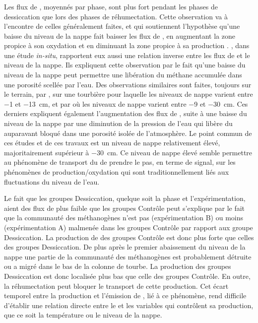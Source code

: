\subsubsection{\chh}
Les flux de \chh, moyennés par phase, sont plus fort pendant les phases de dessiccation que lors des phases de réhumectation.
Cette observation va à l'encontre de celles généralement faites, et qui soutiennent l'hypothèse qu'une baisse du niveau de la nappe fait baisser les flux de \chh, en augmentant la zone propice à son oxydation et en diminuant la zone propice à sa production \citep{aerts1997,pelletier2007,turetsky2008}.
\citet{kettunen1996}, dans une étude \textit{in-situ}, rapportent eux aussi une relation inverse entre les flux de \chh et le niveau de la nappe.
Ils expliquent cette observation par le fait qu'une baisse du niveau de la nappe peut permettre une libération du méthane accumulée dans une porosité scellée par l'eau.
Des observations similaires sont faites, toujours sur le terrain, par \citet{bellisario1999}, sur une tourbière pour laquelle les niveaux de nappe varient entre \num{-1} et \SI{-13}{\centi\metre}, et par \citet{treat2007} où les niveaux de nappe varient entre \num{-9} et \SI{-30}{\centi\metre}.
Ces derniers expliquent également l'augmentation des flux de \chh, suite à une baisse du niveau de la nappe par une diminution de la pression de l'eau qui libère du \chh auparavant bloqué dans une porosité isolée de l'atmosphère.
Le point commun de ces études et de ces travaux est un niveau de nappe relativement élevé, majoritairement supérieur à \SI{-30}{\centi\metre}.
Ce niveau de nappe élevé semble permettre au phénomène de transport du \chh de prendre le pas, en terme de signal, sur les phénomènes de production/oxydation qui sont traditionnellement liés aux fluctuations du niveau de l'eau.

Le fait que les groupes Dessiccation, quelque soit la phase et l'expérimentation, aient des flux de \chh plus faible que les groupes Contrôle peut s'explique par le fait que la communauté des méthanogènes n'est pas (expérimentation B) ou moins (expérimentation A) malmenée dans les groupes Contrôle par rapport aux groupe Dessiccation.
La production de \chh des groupes Contrôle est donc plus forte que celles des groupes Dessiccation.
De plus après le premier abaissement du niveau de la nappe une partie de la communauté des méthanogènes est probablement détruite ou a migré dans le bas de la colonne de tourbe.
La production des groupes Dessiccation est donc localisée plus bas que celle des groupes Contrôle.
En outre, la réhumectation peut bloquer le transport de cette production.
Cet écart temporel entre la production et l'émission de \chh, lié à ce phénomène, rend difficile d'établir une relation directe entre le \chh et les variables qui contrôlent sa production, que ce soit la température ou le niveau de la nappe.

